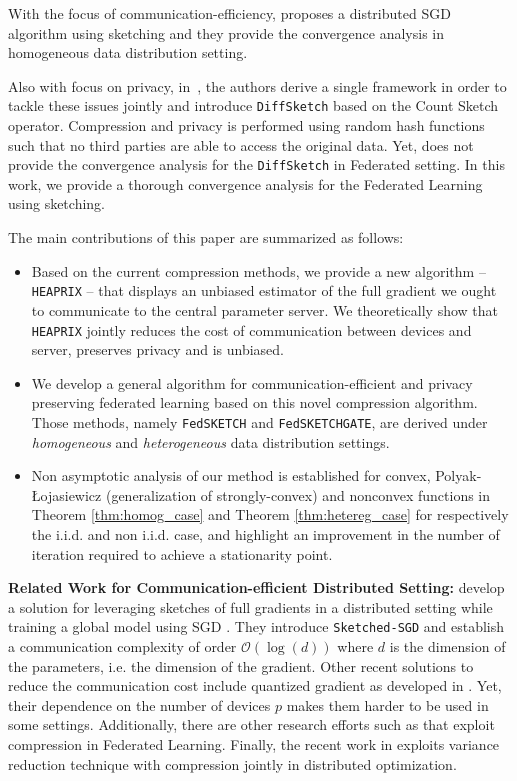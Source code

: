 \documentclass{article}
\newcommand{\pl}{Polyak-\L{}ojasiewicz}
\begin{document}
With the focus of communication-efficiency, \cite{ivkin2019communication} proposes a distributed SGD algorithm using sketching and they provide the convergence analysis in homogeneous data distribution setting. 

Also with focus on privacy,  in~\cite{li2019privacy}, the authors derive a single framework in order to tackle these issues jointly and introduce \texttt{DiffSketch} based on the Count Sketch operator. Compression and privacy is performed using random hash functions such that no third parties are able to access the original data. Yet, \cite{li2019privacy} does not provide the convergence analysis for the \texttt{DiffSketch} in Federated setting. In this work, we provide a thorough convergence analysis for the Federated Learning using sketching.

The main contributions of this paper are summarized as follows:
\begin{itemize}
    \item Based on the current compression methods, we provide a new algorithm -- \texttt{HEAPRIX} -- that displays an unbiased estimator of the full gradient we ought to communicate to the central parameter server. We theoretically show that \texttt{HEAPRIX} jointly reduces the cost of communication between devices and server, preserves privacy and is unbiased.
    
    \item We develop a general algorithm for communication-efficient and privacy preserving federated learning based on this novel compression algorithm. 
Those methods, namely \texttt{FedSKETCH} and \texttt{FedSKETCHGATE}, are derived under \textit{homogeneous} and \textit{heterogeneous} data distribution settings.
   
    \item Non asymptotic analysis of our method is established for convex, \pl\: (generalization of strongly-convex) and nonconvex functions in Theorem \ref{thm:homog_case} and Theorem \ref{thm:hetereg_case} for respectively the i.i.d. and non i.i.d. case,  and highlight an improvement in the number of iteration required to achieve a stationarity point.
\end{itemize}


\textbf{Related Work for Communication-efficient Distributed Setting:} \cite{ivkin2019communication} develop a solution for leveraging sketches of full gradients in a distributed setting while training a global model using SGD \cite{robbins1951stochastic, bottou2008tradeoffs}. They introduce \texttt{Sketched-SGD} and establish a communication complexity of order $\mathcal{O}(\log(d))$ where $d$ is the dimension of the parameters, i.e. the dimension of the gradient.
Other recent solutions to reduce the communication cost include quantized gradient as developed in \cite{alistarh2017qsgd,lin2017deep,stich2018sparsified}. 
Yet, their dependence on the number of devices $p$ makes them harder to be used in some settings. Additionally, there are other research efforts such as \cite{haddadpour2020federated,reisizadeh2019fedpaq,basu2019qsparse} that exploit compression in Federated Learning. 
Finally, the recent work in \cite{horvath2020better} exploits variance reduction technique with compression jointly in distributed optimization.
\end{document}
